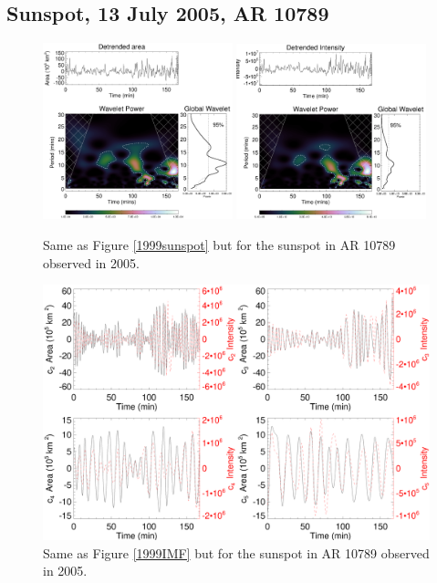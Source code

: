 \subsection{Sunspot, 13 July 2005, AR 10789}
   
   \begin{figure}
   \centering
   \includegraphics[width=0.49\textwidth]{2005_wl.eps}
   \includegraphics[width=0.49\textwidth]{2005_wl_inten.eps}
      \caption{
      			Same as Figure \ref{1999sunspot} but for the sunspot in AR 10789 observed in 2005.
      		  }
      \label{2005sunspot}
   \end{figure}

   \begin{figure}
   \centering
   \includegraphics[width=\textwidth]{2005_IMFs.eps}
      \caption{
      			Same as Figure \ref{1999IMF} but for the sunspot in AR 10789 observed in 2005.
      		  }
      \label{20005IMF}
   \end{figure}
   
